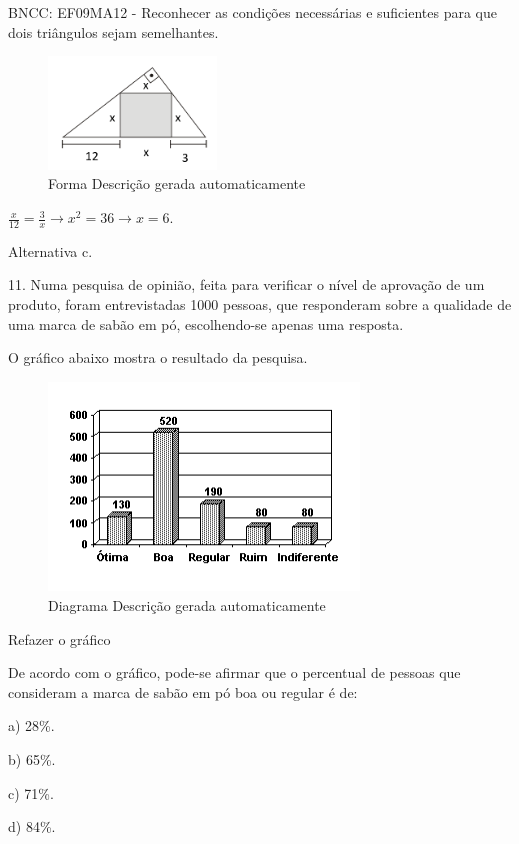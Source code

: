 \begin{escolha}
\begin{escolha}
\begin{escolha}
\begin{escolha}
{\begin{boxmedio}
\begin{boxpeq}
\begin{q°}
\begin{boxmedio}
\begin{boxpeq}
\begin{boxpeq}
\begin{boxmedio}
\begin{boxmedio}
\begin{boxmedio}
\begin{largebox}
\begin{boxmedio}
{\begin{escolha}
\begin{escolha}
\begin{escolha}
\begin{escolha}
\begin{escolha}
\begin{escolha}
{BNCC: EF09MA12 - Reconhecer as condições necessárias e suficientes para
que dois triângulos sejam semelhantes.

\begin{figure}
\centering
\includegraphics[width=1.75521in,height=1.18424in]{./_SAEB_9_MAT/media/image273.png}
\caption{Forma Descrição gerada automaticamente}
\end{figure}

$\frac{x}{12} = \frac{3}{x} \rightarrow x^{2} = 36 \rightarrow x = 6$.

Alternativa c.

11. Numa pesquisa de opinião, feita para verificar o nível de aprovação
de um produto, foram entrevistadas 1000 pessoas, que responderam sobre a
qualidade de uma marca de sabão em pó, escolhendo-se apenas uma
resposta.

O gráfico abaixo mostra o resultado da pesquisa.

\begin{figure}
\centering
\includegraphics[width=3.25in,height=2.18333in]{./_SAEB_9_MAT/media/image279.png}
\caption{Diagrama Descrição gerada automaticamente}
\end{figure}

Refazer o gráfico

De acordo com o gráfico, pode-se afirmar que o percentual de pessoas que
consideram a marca de sabão em pó boa ou regular é de:

a) 28\%.

b) 65\%.

c) 71\%.

d) 84\%.

}
\end{escolha}
\end{escolha}
\end{escolha}
\end{escolha}
\end{escolha}
\end{escolha}}
\end{boxmedio}
\end{largebox}
\end{boxmedio}
\end{boxmedio}
\end{boxmedio}
\end{boxpeq}
\end{boxpeq}
\end{boxmedio}
\end{q°}
\end{boxpeq}
\end{boxmedio}}
\end{escolha}
\end{escolha}
\end{escolha}
\end{escolha}
